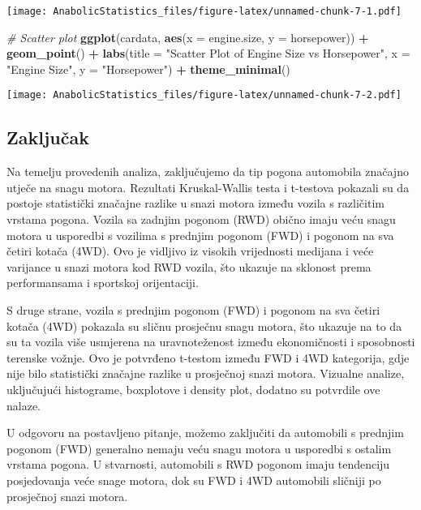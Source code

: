 \documentclass[
]{article}
\newenvironment{Shaded}{\begin{snugshade}}{\end{snugshade}}
\newcommand{\AttributeTok}[1]{\textcolor[rgb]{0.13,0.29,0.53}{#1}}
\newcommand{\CommentTok}[1]{\textcolor[rgb]{0.56,0.35,0.01}{\textit{#1}}}
\newcommand{\FunctionTok}[1]{\textcolor[rgb]{0.13,0.29,0.53}{\textbf{#1}}}
\newcommand{\NormalTok}[1]{#1}
\newcommand{\SpecialCharTok}[1]{\textcolor[rgb]{0.81,0.36,0.00}{\textbf{#1}}}
\newcommand{\StringTok}[1]{\textcolor[rgb]{0.31,0.60,0.02}{#1}}
\begin{document}
\texttt{[image: AnabolicStatistics\_files/figure-latex/unnamed-chunk-7-1.pdf]}

\begin{Shaded}
\begin{Highlighting}[]
\CommentTok{\# Scatter plot}
\FunctionTok{ggplot}\NormalTok{(cardata, }\FunctionTok{aes}\NormalTok{(}\AttributeTok{x =}\NormalTok{ engine.size, }\AttributeTok{y =}\NormalTok{ horsepower)) }\SpecialCharTok{+}
  \FunctionTok{geom\_point}\NormalTok{() }\SpecialCharTok{+}
  \FunctionTok{labs}\NormalTok{(}\AttributeTok{title =} \StringTok{"Scatter Plot of Engine Size vs Horsepower"}\NormalTok{,}
       \AttributeTok{x =} \StringTok{"Engine Size"}\NormalTok{,}
       \AttributeTok{y =} \StringTok{"Horsepower"}\NormalTok{) }\SpecialCharTok{+}
  \FunctionTok{theme\_minimal}\NormalTok{()}
\end{Highlighting}
\end{Shaded}

\texttt{[image: AnabolicStatistics\_files/figure-latex/unnamed-chunk-7-2.pdf]}

\subsection{Zaključak}\label{zakljuux10dak}

Na temelju provedenih analiza, zaključujemo da tip pogona automobila
značajno utječe na snagu motora. Rezultati Kruskal-Wallis testa i
t-testova pokazali su da postoje statistički značajne razlike u snazi
motora između vozila s različitim vrstama pogona. Vozila sa zadnjim
pogonom (RWD) obično imaju veću snagu motora u usporedbi s vozilima s
prednjim pogonom (FWD) i pogonom na sva četiri kotača (4WD). Ovo je
vidljivo iz visokih vrijednosti medijana i veće varijance u snazi motora
kod RWD vozila, što ukazuje na sklonost prema performansama i sportskoj
orijentaciji.

S druge strane, vozila s prednjim pogonom (FWD) i pogonom na sva četiri
kotača (4WD) pokazala su sličnu prosječnu snagu motora, što ukazuje na
to da su ta vozila više usmjerena na uravnoteženost između ekonomičnosti
i sposobnosti terenske vožnje. Ovo je potvrđeno t-testom između FWD i
4WD kategorija, gdje nije bilo statistički značajne razlike u prosječnoj
snazi motora. Vizualne analize, uključujući histograme, boxplotove i
density plot, dodatno su potvrdile ove nalaze.

U odgovoru na postavljeno pitanje, možemo zaključiti da automobili s
prednjim pogonom (FWD) generalno nemaju veću snagu motora u usporedbi s
ostalim vrstama pogona. U stvarnosti, automobili s RWD pogonom imaju
tendenciju posjedovanja veće snage motora, dok su FWD i 4WD automobili
sličniji po prosječnoj snazi motora.
\end{document}
